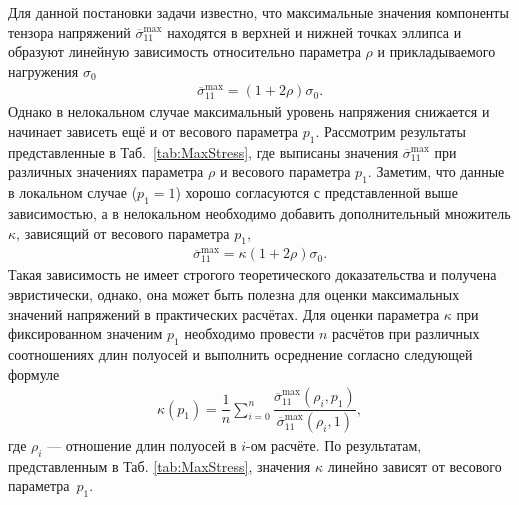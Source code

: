 Для данной постановки задачи известно, что максимальные значения компоненты тензора напряжений $\overline{\sigma}_{11}^{\max}$ находятся в верхней и нижней точках эллипса и образуют линейную зависимость относительно параметра $\rho$ и прикладываемого нагружения $\sigma_0$ \cite{Birger, Bezuh}
\begin{gather*}
	\overline{\sigma}_{11}^{\max} = \left( 1 + 2 \rho \right) \sigma_0.
\end{gather*}
Однако в нелокальном случае максимальный уровень напряжения снижается и начинает зависеть ещё и от весового параметра $p_1$. Рассмотрим результаты представленные в \mbox{Таб. \ref{tab:MaxStress}}, где выписаны значения $\overline{\sigma}_{11}^{\max}$ при различных значениях параметра $\rho$ и весового параметра $p_1$. Заметим, что данные в локальном случае ($p_1 = 1$) хорошо согласуются с представленной выше зависимостью, а в нелокальном необходимо добавить дополнительный множитель $\kappa$, зависящий от весового параметра $p_1$,
\begin{gather*}
	\overline{\sigma}_{11}^{\max} = \kappa \left( 1 + 2 \rho \right) \sigma_0.
\end{gather*}
Такая зависимость не имеет строгого теоретического доказательства и получена эвристически, однако, она может быть полезна для оценки максимальных значений напряжений в практических расчётах. Для оценки параметра $\kappa$ при фиксированном значеним $p_1$ необходимо провести $n$ расчётов при различных соотношениях длин полуосей и выполнить осреднение согласно следующей формуле
\begin{gather}
	\label{eq:Averaging}
	\kappa (p_1) = \dfrac{1}{n} \sum\limits_{i = 0}^{n} \dfrac{\overline{\sigma}_{11}^{\max} (\rho_i, p_1)}{\overline{\sigma}_{11}^{\max} (\rho_i, 1)},
\end{gather}
где $\rho_i$ --- отношение длин полуосей в $i$-ом расчёте. По результатам, представленным в Таб. \ref{tab:MaxStress}, значения $\kappa$ линейно зависят от весового параметра~$p_1$.

